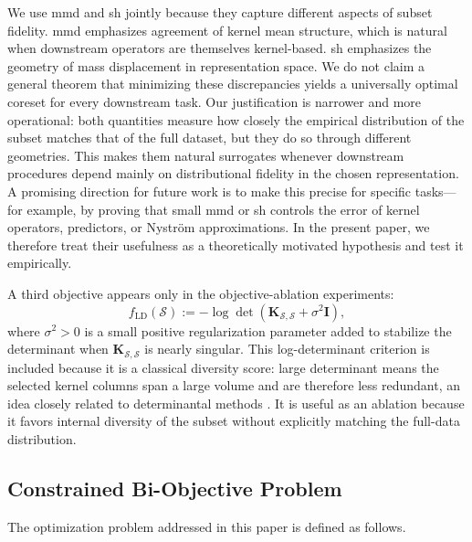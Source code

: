 \documentclass[10pt,journal]{IEEEtran}
\newcommand{\1}{\mathbf{1}}
\newcommand{\bK}{\mathbf{K}}
\newcommand{\bI}{\mathbf{I}}
\newcommand{\Sel}{\mathcal{S}}
\theoremstyle{ieeethm}
\begin{document}
We use \gls{mmd} and \gls{sh} jointly because they capture different aspects of subset fidelity. \gls{mmd} emphasizes agreement of kernel mean structure, which is natural when downstream operators are themselves kernel-based. \gls{sh} emphasizes the geometry of mass displacement in representation space. We do not claim a general theorem that minimizing these discrepancies yields a universally optimal coreset for every downstream task. Our justification is narrower and more operational: both quantities measure how closely the empirical distribution of the subset matches that of the full dataset, but they do so through different geometries. This makes them natural surrogates whenever downstream procedures depend mainly on distributional fidelity in the chosen representation. A promising direction for future work is to make this precise for specific tasks---for example, by proving that small \gls{mmd} or \gls{sh} controls the error of kernel operators, predictors, or Nyström approximations. In the present paper, we therefore treat their usefulness as a theoretically motivated hypothesis and test it empirically.

A third objective appears only in the objective-ablation experiments:
\[
f_{\mathrm{LD}}(\Sel):=-\log\det(\bK_{\Sel,\Sel}+\sigma^2\bI),
\]
where $\sigma^2>0$ is a small positive regularization parameter added to stabilize the determinant when $\bK_{\Sel,\Sel}$ is nearly singular. This log-determinant criterion is included because it is a classical diversity score: large determinant means the selected kernel columns span a large volume and are therefore less redundant, an idea closely related to determinantal methods \cite{kulesza2012dpp}. It is useful as an ablation because it favors internal diversity of the subset without explicitly matching the full-data distribution.

\subsection{Constrained Bi-Objective Problem}
\label{subsec:biobj_def}

The optimization problem addressed in this paper is defined as follows.
\end{document}

